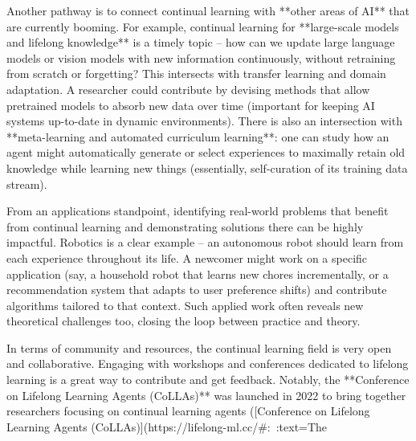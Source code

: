 Another pathway is to connect continual learning with **other areas of AI** that are currently booming. For example, continual learning for **large-scale models and lifelong knowledge** is a timely topic – how can we update large language models or vision models with new information continuously, without retraining from scratch or forgetting? This intersects with transfer learning and domain adaptation. A researcher could contribute by devising methods that allow pretrained models to absorb new data over time (important for keeping AI systems up-to-date in dynamic environments). There is also an intersection with **meta-learning and automated curriculum learning**: one can study how an agent might automatically generate or select experiences to maximally retain old knowledge while learning new things (essentially, self-curation of its training data stream).

From an applications standpoint, identifying real-world problems that benefit from continual learning and demonstrating solutions there can be highly impactful. Robotics is a clear example – an autonomous robot should learn from each experience throughout its life. A newcomer might work on a specific application (say, a household robot that learns new chores incrementally, or a recommendation system that adapts to user preference shifts) and contribute algorithms tailored to that context. Such applied work often reveals new theoretical challenges too, closing the loop between practice and theory.

In terms of community and resources, the continual learning field is very open and collaborative. Engaging with workshops and conferences dedicated to lifelong learning is a great way to contribute and get feedback. Notably, the **Conference on Lifelong Learning Agents (CoLLAs)** was launched in 2022 to bring together researchers focusing on continual learning agents ([Conference on Lifelong Learning Agents (CoLLAs)](https://lifelong-ml.cc/#:~:text=The%

